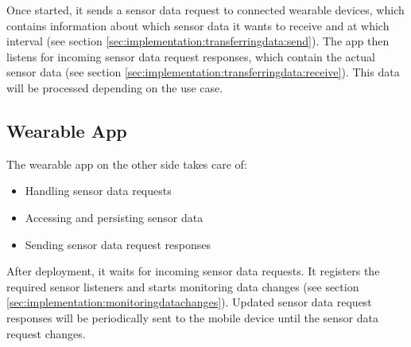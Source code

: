 Once started, it sends a sensor data request to connected wearable devices, which contains information about which sensor data it wants to receive and at which interval (see section \ref{sec:implementation:transferringdata:send}).
The app then listens for incoming sensor data request responses, which contain the actual sensor data (see section \ref{sec:implementation:transferringdata:receive}).
This data will be processed depending on the use case.

\subsection{Wearable App}
\label{sec:concept:wearableapp}
The wearable app on the other side takes care of:
\begin{itemize}[noitemsep]
	\item Handling sensor data requests
	\item Accessing and persisting sensor data
	\item Sending sensor data request responses
\end{itemize}

After deployment, it waits for incoming sensor data requests.
It registers the required sensor listeners and starts monitoring data changes (see section \ref{sec:implementation:monitoringdatachanges}).
Updated sensor data request responses will be periodically sent to the mobile device until the sensor data request changes.

\clearpage